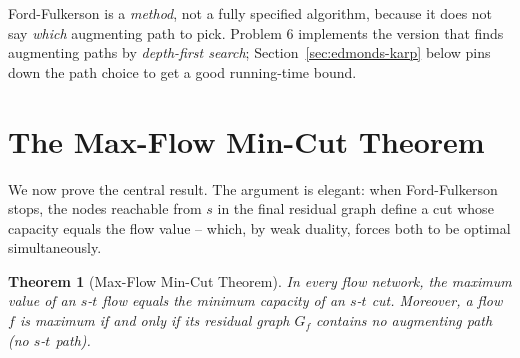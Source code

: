 \documentclass[11pt]{article}
\newtheorem{theorem}{Theorem}[section]
\begin{document}
Ford-Fulkerson is a \emph{method}, not a fully specified algorithm, because it does not
say \emph{which} augmenting path to pick. Problem 6 implements the version that finds
augmenting paths by \emph{depth-first search}; Section~\ref{sec:edmonds-karp} below pins
down the path choice to get a good running-time bound.

\section{The Max-Flow Min-Cut Theorem}
\label{sec:mfmc}

We now prove the central result. The argument is elegant: when Ford-Fulkerson stops, the
nodes reachable from $s$ in the final residual graph define a cut whose capacity equals
the flow value -- which, by weak duality, forces both to be optimal simultaneously.

\begin{theorem}[Max-Flow Min-Cut Theorem]
\label{thm:mfmc}
In every flow network, the maximum value of an $s$-$t$ flow equals the minimum capacity of
an $s$-$t$ cut. Moreover, a flow $f$ is maximum if and only if its residual graph $G_f$
contains \emph{no} augmenting path (no $s$-$t$ path).
\end{theorem}
\end{document}
